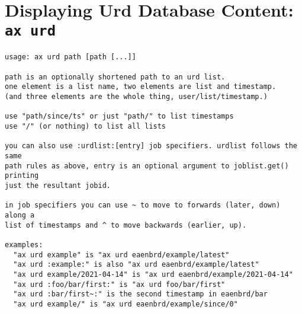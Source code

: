 \section{Displaying Urd Database Content: \texttt{ax urd}}
\begin{snugshade}
\begin{verbatim}
usage: ax urd path [path [...]]

path is an optionally shortened path to an urd list.
one element is a list name, two elements are list and timestamp.
(and three elements are the whole thing, user/list/timestamp.)

use "path/since/ts" or just "path/" to list timestamps
use "/" (or nothing) to list all lists

you can also use :urdlist:[entry] job specifiers. urdlist follows the same
path rules as above, entry is an optional argument to joblist.get() printing
just the resultant jobid.

in job specifiers you can use ~ to move to forwards (later, down) along a
list of timestamps and ^ to move backwards (earlier, up).

examples:
  "ax urd example" is "ax urd eaenbrd/example/latest"
  "ax urd :example:" is also "ax urd eaenbrd/example/latest"
  "ax urd example/2021-04-14" is "ax urd eaenbrd/example/2021-04-14"
  "ax urd :foo/bar/first:" is "ax urd foo/bar/first"
  "ax urd :bar/first~:" is the second timestamp in eaenbrd/bar
  "ax urd example/" is "ax urd eaenbrd/example/since/0"
\end{verbatim}
\end{snugshade}
